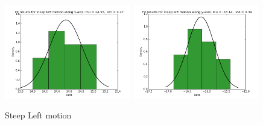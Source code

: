 \documentclass[10pt]{scrartcl}
\begin{document}
\begin{figure}[H]
\centering
\caption{Steep Left motion}
\label{fig:15}
\includegraphics[width=0.49\textwidth ]{images/steep_left_x_data}
\includegraphics[width=0.49\textwidth]{images/steep_left_y_data}
\end{figure}
\end{document}
